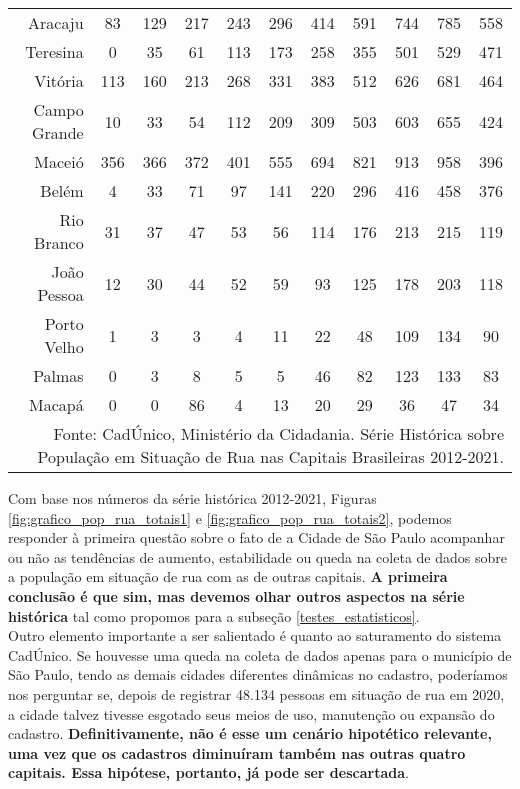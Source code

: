 \documentclass[14pt]{extarticle}
\begin{document}
\begin{table}[htbp]
\begin{adjustbox}{max width=\linewidth}
\begin{tabular}{rcccccccccc}
    Aracaju & 83   & 129  & 217  & 243  & 296  & 414  & 591  & 744  & 785  & 558 \\
    Teresina & 0    & 35   & 61   & 113  & 173  & 258  & 355  & 501  & 529  & 471 \\
    Vitória & 113  & 160  & 213  & 268  & 331  & 383  & 512  & 626  & 681  & 464 \\
    Campo Grande & 10   & 33   & 54   & 112  & 209  & 309  & 503  & 603  & 655  & 424 \\
    Maceió & 356  & 366  & 372  & 401  & 555  & 694  & 821  & 913  & 958  & 396 \\
    Belém & 4    & 33   & 71   & 97   & 141  & 220  & 296  & 416  & 458  & 376 \\
    Rio Branco & 31   & 37   & 47   & 53   & 56   & 114  & 176  & 213  & 215  & 119 \\
    João Pessoa & 12   & 30   & 44   & 52   & 59   & 93   & 125  & 178  & 203  & 118 \\
    Porto Velho & 1    & 3    & 3    & 4    & 11   & 22   & 48   & 109  & 134  & 90 \\
    Palmas & 0    & 3    & 8    & 5    & 5    & 46   & 82   & 123  & 133  & 83 \\
    Macapá & 0    & 0    & 86   & 4    & 13   & 20   & 29   & 36   & 47   & 34 \\
    \hline
    \multicolumn{11}{r}{Fonte: CadÚnico, Ministério da Cidadania. Série Histórica sobre População em Situação de Rua nas Capitais Brasileiras 2012-2021.} \\
    \end{tabular}%
\end{adjustbox}
  \label{tab:tab_capitais_totais}%
\end{table}%


Com base nos números da série histórica 2012-2021, Figuras \ref{fig:grafico_pop_rua_totais1} e \ref{fig:grafico_pop_rua_totais2}, podemos responder à primeira questão sobre o fato de a Cidade de São Paulo acompanhar ou não as tendências de aumento, estabilidade ou queda na coleta de dados sobre a população em situação de rua com as de outras capitais. \textbf{A primeira conclusão é que sim, mas devemos olhar outros aspectos na série histórica} tal como propomos para a subseção \ref{testes_estatisticos}.\\ 

Outro elemento importante a ser salientado é quanto ao saturamento do sistema CadÚnico. Se houvesse uma queda na coleta de dados apenas para o município de São Paulo, tendo as demais cidades diferentes dinâmicas no cadastro, poderíamos nos perguntar se, depois de registrar 48.134 pessoas em situação de rua em 2020, a cidade talvez tivesse esgotado seus meios de uso, manutenção ou expansão do cadastro. \textbf{Definitivamente, não é esse um cenário hipotético relevante, uma vez que os cadastros diminuíram também nas outras quatro capitais. Essa hipótese, portanto, já pode ser descartada}.\\
\end{document}
